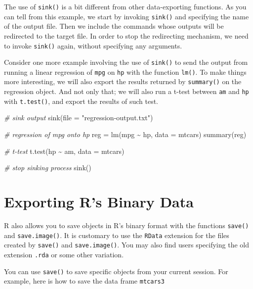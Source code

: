 \documentclass[
]{book}
\newenvironment{Shaded}{\begin{snugshade}}{\end{snugshade}}
\newcommand{\AttributeTok}[1]{\textcolor[rgb]{0.77,0.63,0.00}{#1}}
\newcommand{\CommentTok}[1]{\textcolor[rgb]{0.56,0.35,0.01}{\textit{#1}}}
\newcommand{\FunctionTok}[1]{\textcolor[rgb]{0.00,0.00,0.00}{#1}}
\newcommand{\NormalTok}[1]{#1}
\newcommand{\OtherTok}[1]{\textcolor[rgb]{0.56,0.35,0.01}{#1}}
\newcommand{\SpecialCharTok}[1]{\textcolor[rgb]{0.00,0.00,0.00}{#1}}
\newcommand{\StringTok}[1]{\textcolor[rgb]{0.31,0.60,0.02}{#1}}
\begin{document}
The use of \texttt{sink()} is a bit different from other data-exporting functions. As
you can tell from this example, we start by invoking \texttt{sink()} and specifying
the name of the output file. Then we include the commands whose outputs will
be redirected to the target file. In order to stop the redirecting mechanism,
we need to invoke \texttt{sink()} again, without specifying any arguments.

Consider one more example involving the use of \texttt{sink()} to send the output
from running a linear regression of \texttt{mpg} on \texttt{hp} with the function \texttt{lm()}.
To make things more interesting, we will also export the results returned by
\texttt{summary()} on the regression object. And not only that; we will also run a
t-test between \texttt{am} and \texttt{hp} with \texttt{t.test()}, and export the results of such test.

\begin{Shaded}
\begin{Highlighting}[]
\CommentTok{\# sink output}
\FunctionTok{sink}\NormalTok{(}\AttributeTok{file =} \StringTok{"regression{-}output.txt"}\NormalTok{)}

\CommentTok{\# regression of mpg onto hp}
\NormalTok{reg }\OtherTok{=} \FunctionTok{lm}\NormalTok{(mpg }\SpecialCharTok{\textasciitilde{}}\NormalTok{ hp, }\AttributeTok{data =}\NormalTok{ mtcars)}
\FunctionTok{summary}\NormalTok{(reg)}

\CommentTok{\# t{-}test}
\FunctionTok{t.test}\NormalTok{(hp }\SpecialCharTok{\textasciitilde{}}\NormalTok{ am, }\AttributeTok{data =}\NormalTok{ mtcars)}

\CommentTok{\# stop sinking process}
\FunctionTok{sink}\NormalTok{()}
\end{Highlighting}
\end{Shaded}

\hypertarget{exporting-rs-binary-data}{%
\section{Exporting R's Binary Data}\label{exporting-rs-binary-data}}

R also allows you to save objects in R's binary format with the functions
\texttt{save()} and \texttt{save.image()}. It is customary to use the \texttt{RData} extension for
the files created by \texttt{save()} and \texttt{save.image()}. You may also find
users specifying the old extension \texttt{.rda} or some other variation.

You can use \texttt{save()} to save specific objects from your current session.
For example, here is how to save the data frame \texttt{mtcars3}
\end{document}
